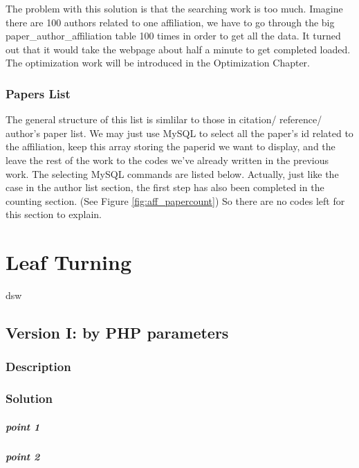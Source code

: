 \documentclass{book}
\begin{document}
The problem with this solution is that the searching work is too much. Imagine there are 100 authors related to one affiliation, we have to go through the big paper\_author\_affiliation table 100 times in order to get all the data. It turned out that it would take the webpage about half a minute to get completed loaded. The optimization work will be introduced in the Optimization Chapter.

\subsection{Papers List}

The general structure of this list is simlilar to those in citation/ reference/ author's paper list. We may just use MySQL to select all the paper's id related to the affiliation, keep this array storing the paperid we want to display, and the leave the rest of the work to the codes we've already written in the previous work. The selecting MySQL commands are listed below. Actually, just like the case in the author list section, the first step has also been completed in the counting section. (See Figure \ref{fig:aff_papercount}) So there are no codes left for this section to explain.

\chapter{Leaf Turning}

dsw

\section{Version I: by PHP parameters}

\subsection{Description}

\subsection{Solution}

\paragraph{point 1}

\paragraph{point 2}
\end{document}
